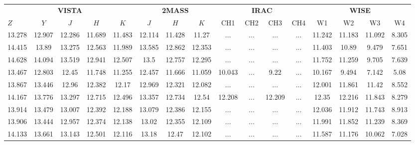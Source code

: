 \documentclass[12pt]{article}
\begin{document}
\begin{table}
\begin{threeparttable}
  \setlength{\tabcolsep}{5pt}
  \begin{tabular}{@{\extracolsep{2pt}}p{0.5cm}ccccccccccccccc@{}}
	\toprule
	\multicolumn{5}{c}{{\bf VISTA}} & \multicolumn{3}{c}{{\bf 2MASS}} & \multicolumn{4}{c}{{\bf IRAC}} & \multicolumn{4}{c}{{\bf WISE}} \\
	\cline{1-5}
	\cline{6-8}
	\cline{9-12}
	\cline{13-16}
	$Z$    & $Y$    & $J$    & $H$    & $K$  & $J$ & $H$ & $K$ & CH1 & CH2 & CH3 & CH4 & W1 & W2 & W3 & W4 \\
	\midrule
	13.278     & 12.907     & 12.286     & 11.689     & 11.483     & 12.114     & 11.428     & 11.27      & ...      & ...      & ...      & ...      & 11.242 & 11.183 & 11.092 & 8.305 \\ %
	14.415     & 13.89      & 13.275     & 12.563     & 11.989     & 13.585     & 12.862     & 12.353     & ...      & ...      & ...      & ...      & 11.403 & 10.89  & 9.479  & 7.651 \\ %
	14.628     & 14.094     & 13.519     & 12.941     & 12.507     & 13.5       & 12.757     & 12.295     & ...      & ...      & ...      & ...      & 11.752 & 11.259 & 9.705  & 7.639 \\ %
	13.467     & 12.803     & 12.45      & 11.748     & 11.255     & 12.457     & 11.666     & 11.059     & 10.043   & ...      & 9.22     & ...      & 10.167 & 9.494  & 7.142  & 5.08  \\ %
	13.867     & 13.446     & 12.96      & 12.382     & 12.17      & 12.969     & 12.321     & 12.082     & ...      & ...      & ...      & ...      & 12.001 & 11.861 & 11.42  & 8.552 \\ %
	14.167     & 13.776     & 13.297     & 12.715     & 12.496     & 13.357     & 12.734     & 12.54      & 12.208   & ...      & 12.209   & ...      & 12.35  & 12.216 & 11.843 & 8.279 \\ %
	13.914     & 13.479     & 13.007     & 12.392     & 12.188     & 13.079     & 12.386     & 12.155     & ...      & ...      & ...      & ...      & 12.036 & 11.912 & 11.743 & 8.913 \\ %
	13.906     & 13.444     & 12.957     & 12.374     & 12.138     & 13.02      & 12.355     & 12.109     & ...      & ...      & ...      & ...      & 11.991 & 11.852 & 11.239 & 8.369 \\ %
	14.133     & 13.661     & 13.143     & 12.501     & 12.116     & 13.18      & 12.47      & 12.102     & ...      & ...      & ...      & ...      & 11.587 & 11.176 & 10.062 & 7.028 \\ %

\end{tabular}
\end{threeparttable}
\end{table}
\end{document}
